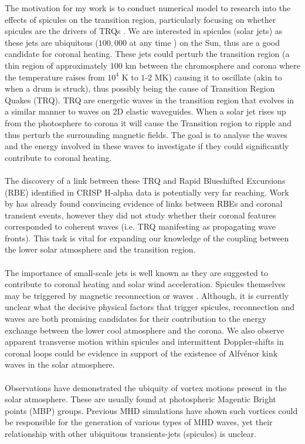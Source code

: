 \documentclass[12pt]{ociamthesis}
\newcommand{\Alfven}{Alfv\'{e}n}
\begin{document}
The motivation for my work is to conduct numerical model to research into the effects of spicules on the transition region, particularly focusing on whether spicules are the drivers of TRQs \citep{Scullion2011}. We are interested in spicules (solar jets) as these jets are ubiquitous ($100,000$  at  any  time \citep{Beckers1968}) on the Sun, thus are a good candidate for coronal heating. These jets could perturb the transition region (a thin region of approximately $100$ km between the chromosphere and corona where the temperature raises from $10^4$ K to $1$-$2$ MK) causing it to oscillate (akin to when a drum is struck), thus possibly being the cause of Transition Region Quakes (TRQ). TRQ are energetic waves in the transition region that evolves in a similar manner to waves on 2D elastic waveguides. When a solar jet rises up from the photosphere to corona it will cause the Transition region to ripple and thus perturb the surrounding magnetic fields. The goal is to analyse the waves and the energy involved in these waves to investigate if they could significantly contribute to coronal heating. \\ \\ The discovery of a link between these TRQ and Rapid Blueshifted Excursions (RBE) identified in CRISP H-alpha data is potentially very far reaching. Work by \cite{Henriques2016} has already found convincing evidence of links between RBEs and coronal transient events, however they did not study whether their coronal features corresponded to coherent waves (i.e. TRQ manifesting as propagating wave fronts). This task is vital for expanding our knowledge of the coupling between the lower solar atmosphere and the transition region. \\ \\ The importance of small-scale jets is well known as they are suggested to contribute to coronal heating and solar wind acceleration. Spicules themselves may be triggered by magnetic reconnection \citep{Pontieu2007PASJ} or waves \citep{Pontieu2004Natur}. Although, it is currently unclear what the decisive physical factors that trigger spicules, reconnection and waves are both promising candidates for their contribution to the energy exchange between the lower cool atmosphere and the corona. We also observe apparent transverse motion within spicules and intermittent Doppler-shifts in coronal loops could be evidence in support of the existence of \Alfven or kink waves in the solar atmosphere.  \\ \\
Observations have demonstrated the ubiquity of vortex motions present in the solar atmosphere. These are usually found at photospheric Magentic Bright points (MBP) groups. Previous MHD simulations have shown such vortices could be responsible for the generation of various types of MHD waves, yet their relationship with other ubiquitous transients-jets (spicules) is unclear.
\end{document}
